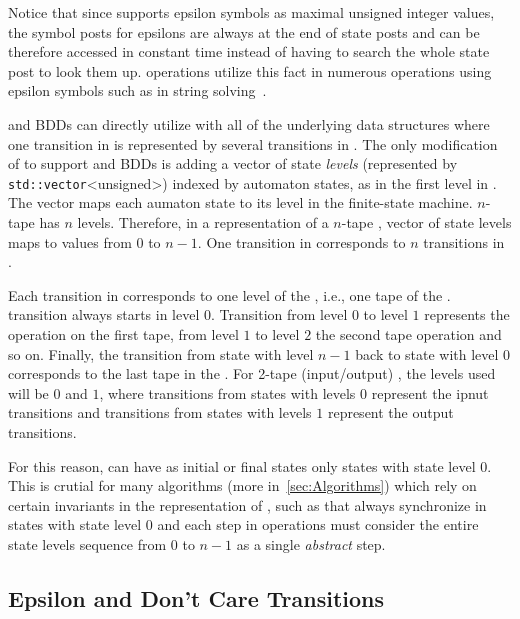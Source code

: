 Notice that since \mata supports epsilon symbols as maximal unsigned integer values, the symbol posts for epsilons are always at the end of state posts and can be therefore accessed in constant time instead of having to search the whole state post to look them up. \mata operations utilize this fact in numerous operations using epsilon symbols such as in string solving~\cite{fm23_equations_synergy_regular_constraints_DBLP:conf/fm/BlahoudekCCHHLS23}.

\nfts and BDDs can directly utilize \nfaClass with all of the underlying data structures where one transition in \nft is represented by several transitions in \nfaClass.
The only modification of \nfaClass to support \nfts and BDDs is adding a vector of state \emph{levels} (represented by \texttt{std::vector}<unsigned>) indexed by automaton states, as in the first level in \deltastruct. The vector maps each aumaton state to its level in the finite-state machine.
$n$-tape \nft has $n$ levels.
Therefore, in a representation of a $n$-tape \nft, vector of state levels maps to values from $0$ to $n-1$.
One transition in \nft corresponds to $n$ transitions in \nfaClass.

Each transition in \nfaClass corresponds to one level of the \nft, i.e., one tape of the \nft.
\nft transition always starts in level $0$. Transition from level $0$ to level $1$ represents the operation on the first \nft tape, from level $1$ to level $2$ the second \nft tape operation and so on.
Finally, the transition from state with level $n-1$ back to state with level $0$ corresponds to the last tape in the \nft.
For 2-tape (input/output) \nft, the levels used will be $0$ and $1$, where transitions from states with levels $0$ represent the ipnut transitions and transitions from states with levels $1$ represent the output transitions.

For this reason, \nfts can have as initial or final states only states with state level $0$.
This is crutial for many algorithms (more in~\ref{sec:Algorithms}) which rely on certain invariants in the representation of \nfts, such as that \nfts always synchronize in states with state level $0$ and each step in operations must consider the entire state levels sequence from $0$ to $n-1$ as a single \emph{abstract} step.

\subsection{Epsilon and Don't Care Transitions}

